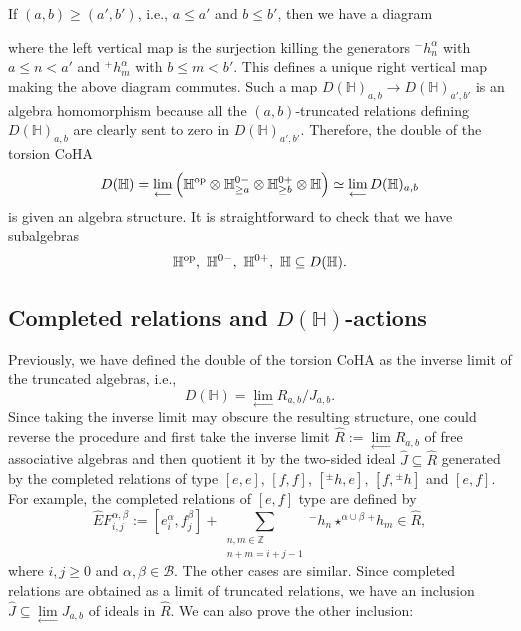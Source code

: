 \documentclass[10pt]{amsart}
\newcommand{\BZ}{\mathbb{Z}}
\newcommand{\BH}{\mathbb{H}}
\newcommand{\CB}{\mathcal{B}}
\newcommand{\op}{\textnormal{op}}
\newcommand{\+}{{}^+}
\theoremstyle{definition}
\theoremstyle {definition}
\theoremstyle {definition}
\begin{document}
If $(a,b)\geq (a',b')$, i.e., $a\leq a'$ and $b\leq b'$, then we have a diagram 
\begin{center}
\end{center}
where the left vertical map is the surjection killing the generators ${}^-h_n^\alpha$ with $a\leq n<a'$ and ${}^+h_m^\alpha$ with $b\leq m<b'$. This defines a unique right vertical map making the above diagram commutes. Such a map $D(\BH)_{a,b}\rightarrow D(\BH)_{a',b'}$ is an algebra homomorphism because all the $(a,b)$-truncated relations defining $D(\BH)_{a,b}$ are clearly sent to zero in $D(\BH)_{a',b'}$. Therefore, the double of the torsion CoHA
$$D(\BH)=\lim_{\longleftarrow} \Big(\BH^{\op}\otimes \BH^{0-}_{\geq a}\otimes \BH^{0+}_{\geq b}\otimes \BH\Big)\simeq \lim_{\longleftarrow} D(\BH)_{a,b}
$$
is given an algebra structure. It is straightforward to check that we have subalgebras 
$$\BH^{\op},\ \BH^{0-},\ \BH^{0+},\ \BH \subseteq D(\BH). $$




\subsection{Completed relations and $D(\BH)$-actions}

Previously, we have defined the double of the torsion CoHA as the inverse limit of the truncated algebras, i.e., 
$$D(\BH)=\lim_{\longleftarrow} R_{a,b}/J_{a,b}. 
$$
Since taking the inverse limit may obscure the resulting structure, one could reverse the procedure and first take the inverse limit $\widehat R:=\lim\limits_{\longleftarrow} R_{a,b}$ of free associative algebras and then quotient it by the two-sided ideal $\widehat J\subseteq \widehat R$ generated by the completed relations of type $[e,e]$, $[f,f]$, $[{}^\pm h,e]$, $[f, {}^\pm h]$ and $[e,f]$. For example, the completed relations of $[e,f]$ type are defined by 
$$\widehat EF^{\alpha,\beta}_{i,j}:=[e^\alpha_i, f^\beta_j]+\sum_{\substack{n, m\in \BZ\\n+m=i+j-1}} {}^{-}h_n\star^{\alpha\cup \beta}{}^{+}h_m\in \widehat R,
$$
where $i, j\geq 0$ and $\alpha,\beta\in \CB$.
The other cases are similar. Since completed relations are obtained as a limit of truncated relations, we have an inclusion $\widehat J\subseteq \lim\limits_{\longleftarrow} J_{a,b}$ of ideals in $\widehat R$. We can also prove the other inclusion:
\end{document}
